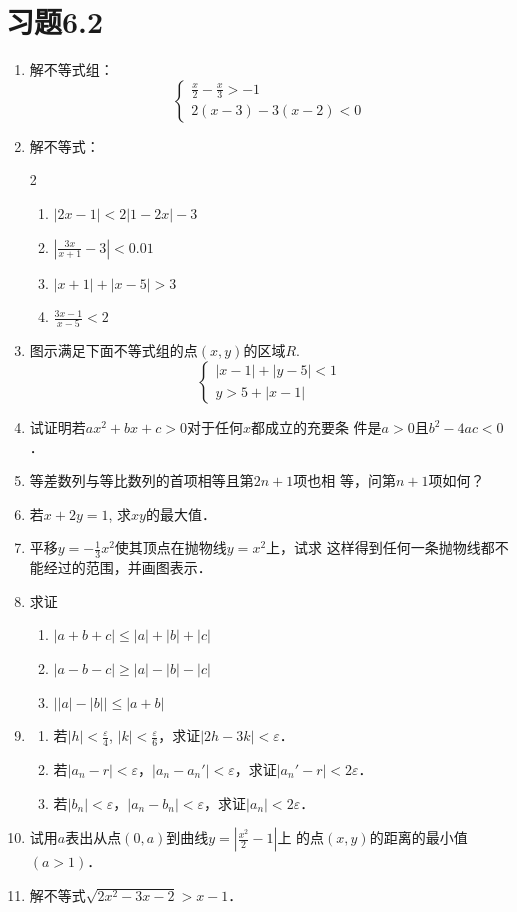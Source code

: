 \section*{习题6.2}

\begin{enumerate}
    \item 解不等式组：
\[\begin{cases}
    \frac{x}{2}-\frac{x}{3}>-1\\
    2(x-3)-3(x-2)<0
\end{cases}\]

\item 解不等式：
\begin{multicols}{2}
\begin{enumerate}
    \item $|2x-1|<2|1-2x|-3$
    \item $\left|\frac{3x}{x+1}-3\right|<0.01$
    \item $|x+1|+|x-5|>3$
    \item $\frac{3x-1}{x-5}<2$
\end{enumerate}
\end{multicols}

\item 图示满足下面不等式组的点$(x,y)$的区域$R$.
\[\begin{cases}
    |x-1|+|y-5|<1\\
y>5+|x-1|
\end{cases}\]
\item 试证明若$ax^2+bx+c>0$对于任何$x$都成立的充要条
件是$a>0$且$b^2-4ac<0$．
\item 等差数列与等比数列的首项相等且第$2n+1$项也相
等，问第$n+1$项如何？
\item 若$x+2y=1$, 求$xy$的最大值．
\item 平移$y=-\frac{1}{3}x^2$使其顶点在抛物线$y=x^2$上，试求
这样得到任何一条抛物线都不能经过的范围，并画图表示．
\item 求证
\begin{enumerate}
    \item $|a+b+c|\le |a|+|b|+|c|$
    \item $|a-b-c|\ge |a|-|b|-|c|$
    \item $\Big| |a|-|b| \Big|\le |a+b|$
\end{enumerate}

\item \begin{enumerate}
    \item 若$|h|<\frac{\varepsilon}{4}$, $|k|<\frac{\varepsilon}{6}$，求证$|2h-3k|<\varepsilon$．
    \item 若$|a_n-r|<\varepsilon$，$|a_n-a_n'|<\varepsilon$，求证$|a_n'-r|<2\varepsilon$．
    \item 若$|b_n|<\varepsilon$，$|a_n-b_n|<\varepsilon$，求证$|a_n|<2\varepsilon$．
\end{enumerate}

\item 试用$a$表出从点$(0,a)$到曲线$y=\left|\frac{x^2}{2}-1\right|$上
的点$(x,y)$的距离的最小值$(a>1)$．

\item 解不等式$\sqrt{2x^2-3x-2}>x-1$．
\end{enumerate}

